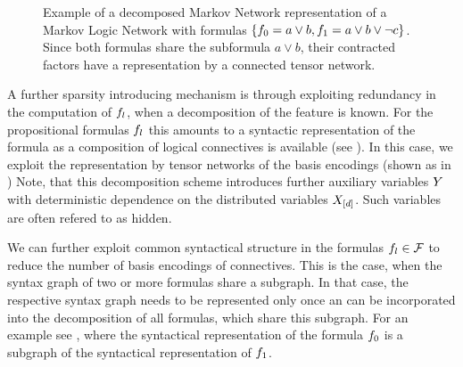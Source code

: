 \begin{figure}[t]
    \begin{center}
        
    \end{center}
    \caption{Example of a decomposed Markov Network representation of a Markov Logic Network with formulas $\{f_{0} = a\lor b, f_{1} = a \lor b \lor \lnot c\}$.
    Since both formulas share the subformula $a\lor b$, their contracted factors have a representation by a connected tensor network.}
    \label{fig:mlnDecRep}
\end{figure}


A further sparsity introducing mechanism is through exploiting redundancy in the computation of $f_{l}$, when a decomposition of the feature is known.
For the propositional formulas $f_{l}$ this amounts to a syntactic representation of the formula as a composition of logical connectives is available (see ). %
In this case, we exploit the representation by tensor networks of the basis encodings (shown as  in )
Note, that this decomposition scheme introduces further auxiliary variables $Y$ with deterministic dependence on the distributed variables $X_{[d]}$.
Such variables are often refered to as hidden.

We can further exploit common syntactical structure in the formulas $f_{l}\in\mathcal{F}$ to reduce the number of basis encodings of connectives.
This is the case, when the syntax graph of two or more formulas share a subgraph.
In that case, the respective syntax graph needs to be represented only once an can be incorporated into the decomposition of all formulas, which share this subgraph.
For an example see , where the syntactical representation of the formula $f_{0}$ is a subgraph of the syntactical representation of $f_{1}$.



